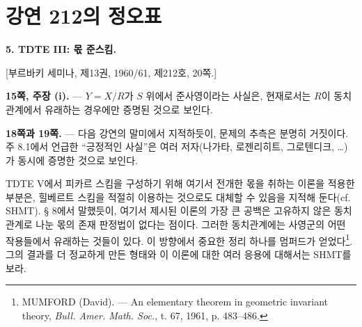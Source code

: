 \clearpage
\chapter*{강연 212의 정오표}
\setcounter{footnote}{2}

\noindent\textbf{5. TDTE III: 몫 준스킴.}

\begin{center}
[부르바키 세미나, 제13권, 1960/61, 제212호, 20쪽.]
\end{center}

\noindent\textbf{15쪽, 주장 (i).} --- $Y=X/R$가 $S$ 위에서
준사영이라는 사실은, 현재로서는 $R$이 동치관계에서 유래하는 경우에만
증명된 것으로 보인다.

\noindent\textbf{18쪽과 19쪽.} --- 다음 강연의 말미에서 지적하듯이,
문제의 추측은 분명히 거짓이다. 주 8.1에서 언급한 ``긍정적인 사실''은
여러 저자(나가타, 로젠리히트, 그로텐디크, \ldots)가 동시에 증명한 것으로
보인다.

TDTE V에서 피카르 스킴을 구성하기 위해 여기서 전개한 몫을 취하는 이론을
적용한 부분은, 힐베르트 스킴을 적절히 이용하는 것으로도 대체할 수 있음을
지적해 둔다(cf. SHMT). § 8에서 말했듯이, 여기서 제시된
이론의 가장 큰 공백은 고유하지 않은 동치관계로 나눈 몫의 존재 판정법이
없다는 점이다. 그러한 동치관계에는 사영군의 어떤 작용들에서 유래하는
것들이 있다. 이 방향에서 중요한 정리 하나를 멈퍼드가 얻었다\footnote{MUMFORD
(David). --- An elementary theorem in geometric invariant theory, \emph{Bull.
Amer. Math. Soc.}, t. 67, 1961, p. 483--486.}. 그의 결과를 더 정교하게 만든
형태와 이 이론에 대한 여러 응용에 대해서는 SHMT를 보라.\par
